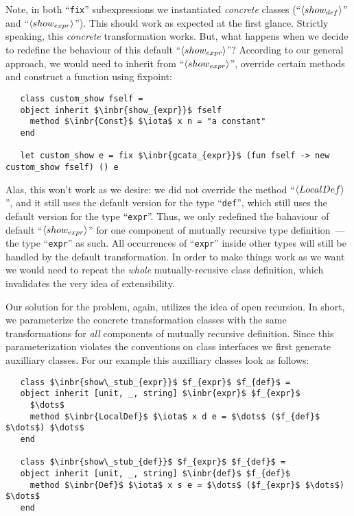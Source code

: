 Note, in both ``\lstinline{fix}'' subexpressions we instantiated \emph{concrete} classes (``$\left<show_{def}\right>$'' and ``$\left<show_{expr}\right>$''). This should
work as expected at the first glance. Strictly speaking, this \emph{concrete} transformation works. But, what happens when we decide to redefine the behaviour of
this default ``$\left<show_{expr}\right>$''? According to our general approach, we would need to inherit from ``$\left<show_{expr}\right>$'', override certain methods and
construct a function using fixpoint:

\begin{lstlisting}
   class custom_show fself =
   object inherit $\inbr{show_{expr}}$ fself
     method $\inbr{Const}$ $\iota$ x n = "a constant"
   end

   let custom_show e = fix $\inbr{gcata_{expr}}$ (fun fself -> new custom_show fself) () e
\end{lstlisting}

Alas, this won't work as we desire: we did not override the method ``$\left<LocalDef\right>$'', and it still uses the default version for the type ``\lstinline{def}'', which
still uses the default version for the type ``\lstinline{expr}''. Thus, we only redefined the bahaviour of default ``$\left<show_{expr}\right>$'' for one component of
mutually recursive type definition~--- the type ``\lstinline{expr}'' as such. All occurrences of ``\lstinline{expr}'' inside other types will still be handled by
the default transformation. In order to make things work as we want we would need to repeat the \emph{whole} mutually-recusive class definition, which invalidates the
very idea of extensibility. 

Our solution for the problem, again, utilizes the idea of open recursion. In short, we parameterize the concrete transformation classes with the same transformations
for \emph{all} components of mutually recursive definition. Since this parameterization violates the conventions on class interfaces we first generate auxilliary classes.
For our example this auxilliary classes look as follows:

\begin{lstlisting}
   class $\inbr{show\_stub_{expr}}$ $f_{expr}$ $f_{def}$ =
   object inherit [unit, _, string] $\inbr{expr}$ $f_{expr}$
     $\dots$
     method $\inbr{LocalDef}$ $\iota$ x d e = $\dots$ ($f_{def}$ $\dots$) $\dots$
   end
     
   class $\inbr{show\_stub_{def}}$ $f_{expr}$ $f_{def}$ =
   object inherit [unit, _, string] $\inbr{def}$ $f_{def}$
     method $\inbr{Def}$ $\iota$ x s e = $\dots$ ($f_{expr}$ $\dots$) $\dots$
   end
\end{lstlisting}

